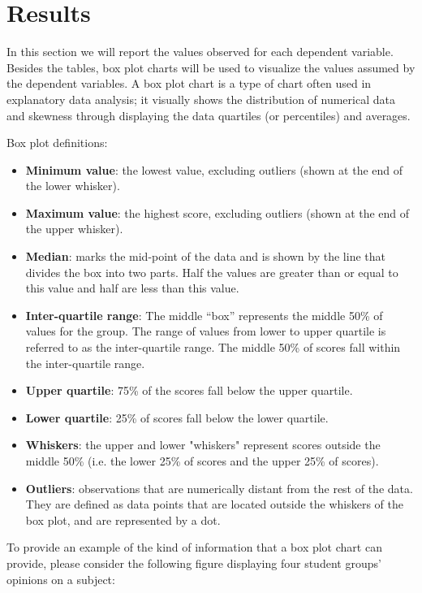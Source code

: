 \section{Results}
In this section we will report the values observed for each dependent variable.
Besides the tables, box plot charts will be used to visualize the values assumed by the dependent variables.
A box plot chart is a type of chart often used in explanatory data analysis; it visually shows the distribution of numerical data and skewness through displaying the data quartiles (or percentiles) and averages.

Box plot definitions:
\begin{itemize}
    \item \textbf{Minimum value}: the lowest value, excluding outliers (shown at the end of the lower whisker).
    \item \textbf{Maximum value}: the highest score, excluding outliers (shown at the end of the upper whisker).
    \item \textbf{Median}: marks the mid-point of the data and is shown by the line that divides the box into two parts. Half the values are greater than or equal to this value and half are less than this value.
    \item \textbf{Inter-quartile range}: The middle “box” represents the middle 50\% of values for the group. The range of values from lower to upper quartile is referred to as the inter-quartile range. The middle 50\% of scores fall within the inter-quartile range.
    \item \textbf{Upper quartile}: 75\% of the scores fall below the upper quartile.
    \item \textbf{Lower quartile}: 25\% of scores fall below the lower quartile.
    \item \textbf{Whiskers}: the upper and lower "whiskers" represent scores outside the middle 50\% (i.e. the lower 25\% of scores and the upper 25\% of scores).
    \item \textbf{Outliers}: observations that are numerically distant from the rest of the data. They are defined as data points that are located outside the whiskers of the box plot, and are represented by a dot.
\end{itemize}

\noindent To provide an example of the kind of information that a box plot chart can provide, please consider the following figure displaying four student groups' opinions on a subject:


